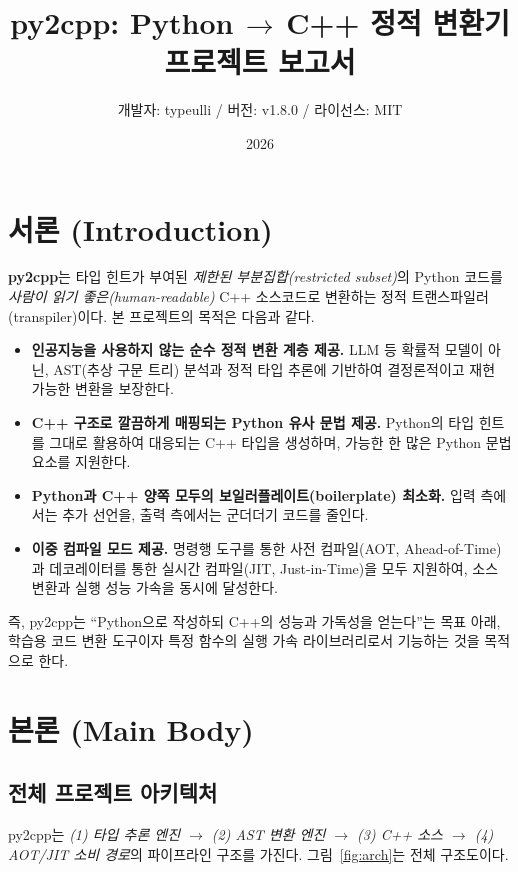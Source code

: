 \documentclass[10pt]{article}
\title{\vspace{-1.2cm}\textbf{py2cpp: Python\,$\to$\,C++ 정적 변환기 프로젝트 보고서}}
\author{개발자: typeulli \quad / \quad 버전: v1.8.0 \quad / \quad 라이선스: MIT}
\date{2026}
\begin{document}
\maketitle
\vspace{-0.8cm}

\section{서론 (Introduction)}
\textbf{py2cpp}는 타입 힌트가 부여된 \emph{제한된 부분집합(restricted subset)}의 Python 코드를 \emph{사람이 읽기 좋은(human-readable)} C++ 소스코드로 변환하는 정적 트랜스파일러(transpiler)이다. 본 프로젝트의 목적은 다음과 같다.

\begin{itemize}
  \item \textbf{인공지능을 사용하지 않는 순수 정적 변환 계층 제공.} LLM 등 확률적 모델이 아닌, AST(추상 구문 트리) 분석과 정적 타입 추론에 기반하여 결정론적이고 재현 가능한 변환을 보장한다.
  \item \textbf{C++ 구조로 깔끔하게 매핑되는 Python 유사 문법 제공.} Python의 타입 힌트를 그대로 활용하여 대응되는 C++ 타입을 생성하며, 가능한 한 많은 Python 문법 요소를 지원한다.
  \item \textbf{Python과 C++ 양쪽 모두의 보일러플레이트(boilerplate) 최소화.} 입력 측에서는 추가 선언을, 출력 측에서는 군더더기 코드를 줄인다.
  \item \textbf{이중 컴파일 모드 제공.} 명령행 도구를 통한 사전 컴파일(AOT, Ahead-of-Time)과 데코레이터를 통한 실시간 컴파일(JIT, Just-in-Time)을 모두 지원하여, 소스 변환과 실행 성능 가속을 동시에 달성한다.
\end{itemize}

즉, py2cpp는 ``Python으로 작성하되 C++의 성능과 가독성을 얻는다''는 목표 아래, 학습용 코드 변환 도구이자 특정 함수의 실행 가속 라이브러리로서 기능하는 것을 목적으로 한다.

\section{본론 (Main Body)}

\subsection{전체 프로젝트 아키텍처}
py2cpp는 \emph{(1) 타입 추론 엔진 $\to$ (2) AST 변환 엔진 $\to$ (3) C++ 소스 $\to$ (4) AOT/JIT 소비 경로}의 파이프라인 구조를 가진다. 그림~\ref{fig:arch}는 전체 구조도이다.
\end{document}
